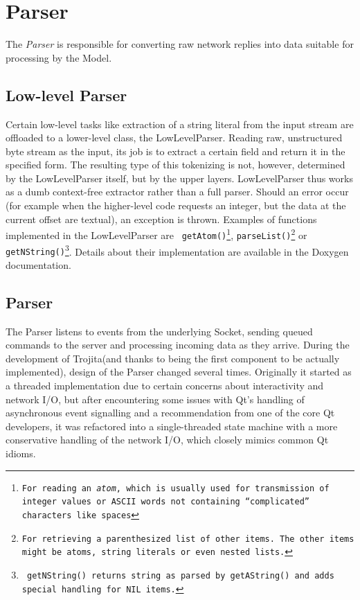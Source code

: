 \documentclass[12pt,notitlepage]{report}
\newcommand{\trojita}{Trojita\xspace}
\begin{document}
\section{Parser}

The {\em Parser} is responsible for converting raw network replies into data
suitable for processing by the Model.

\subsection{Low-level Parser}

Certain low-level tasks like extraction of a string literal from the input
stream are offloaded to a lower-level class, the LowLevelParser.  Reading raw,
unstructured byte stream as the input, its job is to extract a certain field and
return it in the specified form.  The resulting type of this tokenizing is not,
however, determined by the LowLevelParser itself, but by the upper layers.
LowLevelParser thus works as a dumb context-free extractor rather than a full
parser.  Should an error occur (for example when the higher-level code requests
an integer, but the data at the current offset are textual), an exception is
thrown.  Examples of functions implemented in the LowLevelParser are {\tt
getAtom()\footnote{For reading an {\em atom}, which is usually used for
transmission of integer values or ASCII words not containing ``complicated''
characters like spaces}}, {\tt parseList()\footnote{For retrieving a
parenthesized list of other items.  The other items might be atoms, string
literals or even nested lists.}} or {\tt getNString()\footnote{ {\tt
getNString()} returns string as parsed by {\tt getAString()} and adds special
handling for {\tt NIL} items.}}.  Details about their implementation are
available in the Doxygen documentation.

\subsection{Parser}

The Parser listens to events from the underlying Socket, sending queued commands
to the server and processing incoming data as they arrive.  During the
development of \trojita (and thanks to being the first component to be actually
implemented), design of the Parser changed several times.  Originally it started
as a threaded implementation due to certain concerns about interactivity and
network I/O, but after encountering some issues with Qt's handling of
asynchronous event signalling and a recommendation from one of the core Qt
developers, it was refactored into a single-threaded state machine with a more
conservative handling of the network I/O, which closely mimics common Qt idioms.
\end{document}
